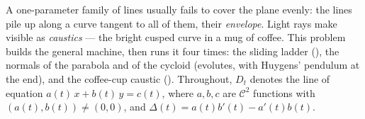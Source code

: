 \begin{problem}\label{pb:b2:curves:1}
A one-parameter family of lines usually fails to cover the
plane evenly: the lines pile up along a curve tangent to all
of them, their \emph{envelope}. Light rays
make  visible as \emph{caustics} --- the bright
cusped curve in a mug of coffee. This problem builds the
general  machine, then runs it four times: the sliding
ladder (), the normals of the parabola and of the
cycloid (evolutes, with Huygens' pendulum at the end), and the
coffee-cup caustic (). Throughout, $D_t$ denotes the
line of equation $a(t)\,x + b(t)\,y = c(t)$, where $a, b, c$
are $\mathcal C^2$ functions with $(a(t), b(t)) \neq (0,0)$,
and $\Delta(t) = a(t)b'(t) - a'(t)b(t)$.


\end{problem}
